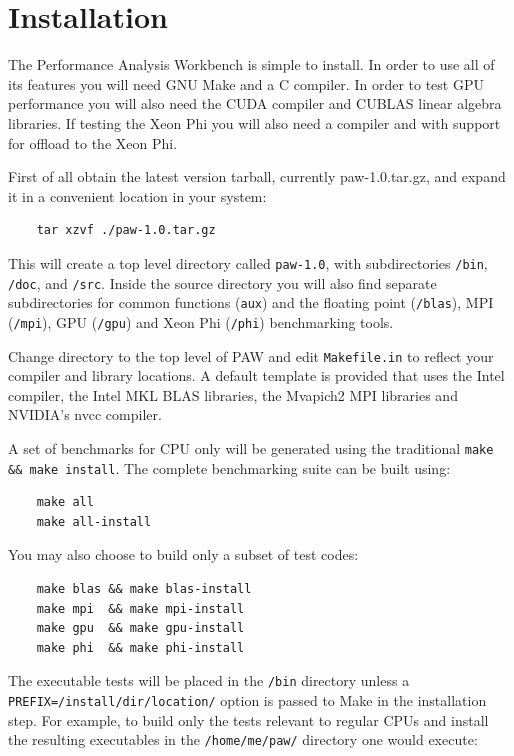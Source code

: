 \documentclass[10pt,a4paper]{report}
\begin{document}
\tableofcontents

\chapter{Installation}
The Performance Analysis Workbench is simple to install. In order to use all of its features you will need GNU Make and a C compiler. In order to test GPU performance you will also need the CUDA compiler and CUBLAS linear algebra libraries. If testing the Xeon Phi you will also need a compiler and with support for offload to the Xeon Phi.

First of all obtain the latest version tarball, currently paw-1.0.tar.gz, and expand it in a convenient location in your system:

\begin{verbatim}
    tar xzvf ./paw-1.0.tar.gz
\end{verbatim}

This will create a top level directory called \verb+paw-1.0+, with subdirectories \verb+/bin+, \verb+/doc+, and \verb+/src+. Inside the source directory you will also find separate subdirectories for common functions (\verb+aux+) and the floating point (\verb+/blas+), MPI (\verb+/mpi+), GPU (\verb+/gpu+) and Xeon Phi (\verb+/phi+) benchmarking tools.

Change directory to the top level of PAW and edit \verb+Makefile.in+ to reflect your compiler and library locations. A default template is provided that uses the Intel compiler, the Intel MKL BLAS libraries, the Mvapich2 MPI libraries and NVIDIA's nvcc compiler.

A set of benchmarks for CPU only will be generated using the traditional \texttt{make \&\& make install}. The complete benchmarking suite can be built using:

\begin{verbatim}
    make all
    make all-install
\end{verbatim}

You may also choose to build only a subset of test codes:

\begin{verbatim}
    make blas && make blas-install
    make mpi  && make mpi-install
    make gpu  && make gpu-install
    make phi  && make phi-install
\end{verbatim}

The executable tests will be placed in the \verb+/bin+ directory unless a \verb+PREFIX=/install/dir/location/+ option is passed to Make in the installation step. For example, to build only the tests relevant to regular CPUs and install the resulting executables in the \verb+/home/me/paw/+ directory one would execute:
\end{document}
